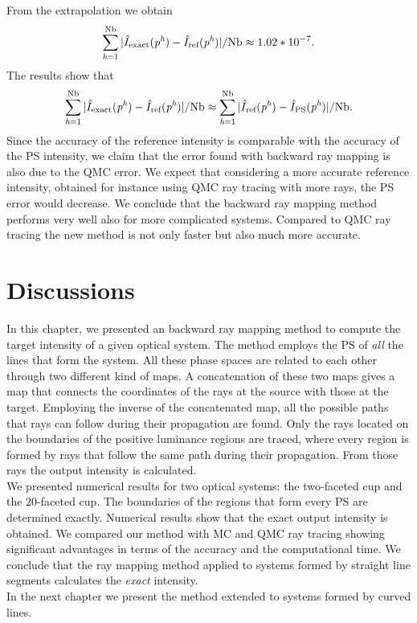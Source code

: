 From the extrapolation we obtain
\begin{equation*}\sum_{\textit{h} = 1}^{\textrm{Nb}}| \hat{I}_{\textrm{exact}}(\textit{p}^{\textit{h}}) - \hat{I}_{\textrm{ref}}(\textit{p}^{\textit{h}})|/\textrm{Nb}\approx 1.02*10^{-7}. \end{equation*}
The results show that 
\begin{equation*}
\sum_{\textit{h} = 1}^{\textrm{Nb}}| \hat{I}_{\textrm{exact}}(\textit{p}^{\textit{h}}) - \hat{I}_{\textrm{ref}}(\textit{p}^{\textit{h}})|/\textrm{Nb}
\approx \sum_{\textit{h} = 1}^{\textrm{Nb}}|\hat{I}_{\textrm{ref}}(\textit{p}^{\textit{h}}) - \hat{I}_{\textrm{PS}}(\textit{p}^{\textit{h}})|/\textrm{Nb}.
\end{equation*}
Since the accuracy of the reference intensity is comparable with the accuracy of the PS intensity, we claim that the error found with backward ray mapping is also due to the QMC error. We expect that considering a more accurate reference intensity, obtained for instance using QMC ray tracing with more rays, the PS error would decrease.
We conclude that the backward ray mapping method performs very well also for more complicated systems.
Compared to QMC ray tracing the new method is not only faster but also much more accurate.
\section{Discussions}
In this chapter, we presented an backward ray mapping method to compute the target intensity of a given optical system.
The method employs the PS of \textit{all} the lines that form the system.
All these phase spaces are related to each other through two different kind of maps.
A concatenation of these two maps gives a map that connects the coordinates of the rays at the source with those at the target.
Employing the inverse of the concatenated map, all the possible paths that rays can follow during their propagation are found. 
Only the rays located on the boundaries of the positive luminance regions are traced,
where every region is formed by rays that follow the same path during their propagation. From those rays the output intensity is calculated. \\ \indent
We presented numerical results for two optical systems: the two-faceted cup and the $20$-faceted cup. The boundaries of the regions that form every PS are determined exactly.
 Numerical results show that the exact output intensity is obtained.
 We compared our method with MC and QMC ray tracing showing significant advantages in terms of the accuracy and the computational time.
 We conclude that the ray mapping method applied to systems formed by straight line segments calculates the \textit{exact} intensity.\\
\indent In the next chapter we present the method extended to systems formed by curved lines. 


